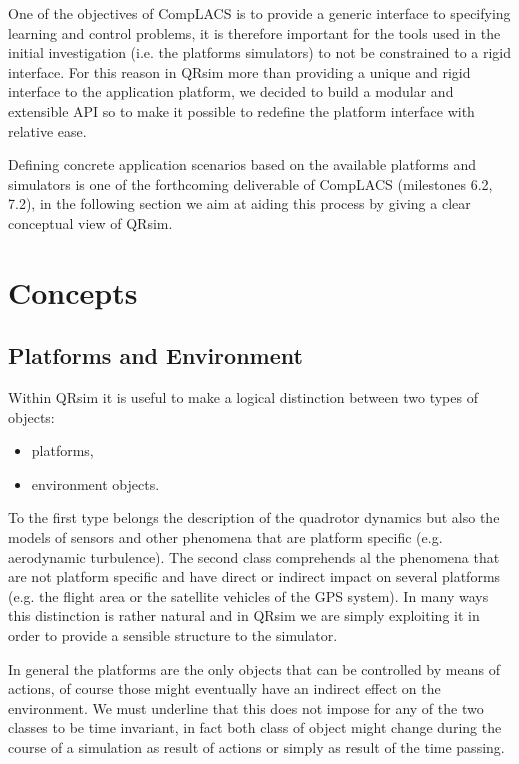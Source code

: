 \documentclass[a4paper,11pt]{report}
\newcommand{\sname}{QRsim\xspace}
\begin{document}
One of the objectives of {CompLACS} is to provide a generic interface to specifying learning and control problems, it is therefore important for the tools used in the initial investigation (i.e. the platforms simulators) to not be constrained to a rigid interface. 
For this reason in \sname more than providing a unique and rigid interface to the application platform, we decided to build a modular and extensible API so to make it possible to redefine the platform interface with relative ease. 

Defining concrete application scenarios based on the available platforms and simulators is one of the forthcoming deliverable of {CompLACS} (milestones 6.2, 7.2), in the following section we aim at aiding this process by giving a clear conceptual view of \sname. 

\section{Concepts}


\subsection{Platforms and Environment}\label{sec:platandenv}
Within \sname it is useful to make a logical distinction between two types of objects:
\begin{itemize}
\item platforms,
\item environment objects.
\end{itemize}
To the first type belongs the description of the quadrotor dynamics but also the models of sensors and other phenomena that are platform specific (e.g. aerodynamic turbulence). The second class comprehends al the phenomena that are not platform specific and have direct or indirect impact on several platforms (e.g. the flight area or the satellite vehicles of the GPS system).
In many ways this distinction is rather natural and in \sname we are simply exploiting it in order to provide a sensible structure to the simulator.

In general the platforms are the only objects that can be controlled by means of actions, of course those might eventually have an indirect effect on the environment. We must underline that this does not impose for any of the two classes to be time invariant, in fact both class of object might change during the course of a simulation as result of actions or simply as result of the time passing.
\end{document}
